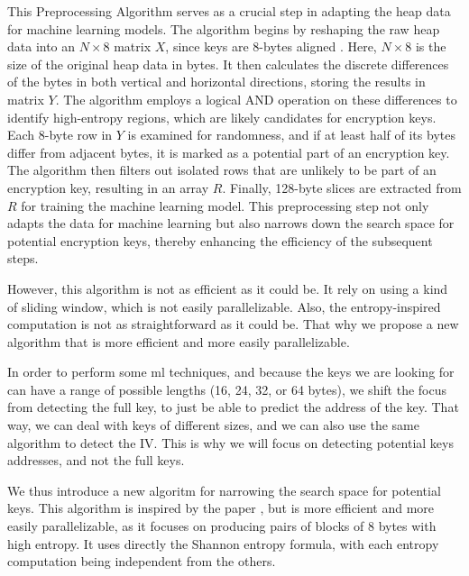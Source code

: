     This Preprocessing Algorithm serves as a crucial step in adapting the heap data for machine learning models. The algorithm begins by reshaping the raw heap data into an \(N \times 8\) matrix \(X\), since keys are 8-bytes aligned \cite{SmartKex22}. Here, \(N \times 8\) is the size of the original heap data in bytes. It then calculates the discrete differences of the bytes in both vertical and horizontal directions, storing the results in matrix \(Y\). The algorithm employs a logical AND operation on these differences to identify high-entropy regions, which are likely candidates for encryption keys. Each 8-byte row in \(Y\) is examined for randomness, and if at least half of its bytes differ from adjacent bytes, it is marked as a potential part of an encryption key. The algorithm then filters out isolated rows that are unlikely to be part of an encryption key, resulting in an array \(R\). Finally, 128-byte slices are extracted from \(R\) for training the machine learning model. This preprocessing step not only adapts the data for machine learning but also narrows down the search space for potential encryption keys, thereby enhancing the efficiency of the subsequent steps. 

    However, this algorithm is not as efficient as it could be. It rely on using a kind of sliding window, which is not easily parallelizable. Also, the entropy-inspired computation is not as straightforward as it could be. That why we propose a new algorithm that is more efficient and more easily parallelizable.

    In order to perform some \acrshort{ml} techniques, and because the keys we are looking for can have a range of possible lengths (16, 24, 32, or 64 bytes), we shift the focus from detecting the full key, to just be able to predict the address of the key. That way, we can deal with keys of different sizes, and we can also use the same algorithm to detect the IV. This is why we will focus on detecting potential keys addresses, and not the full keys.

    We thus introduce a new algoritm for narrowing the search space for potential keys. This algorithm is inspired by the paper , but is more efficient and more easily parallelizable, as it focuses on producing pairs of blocks of 8 bytes with high entropy. It uses directly the Shannon entropy formula, with each entropy computation being independent from the others.

